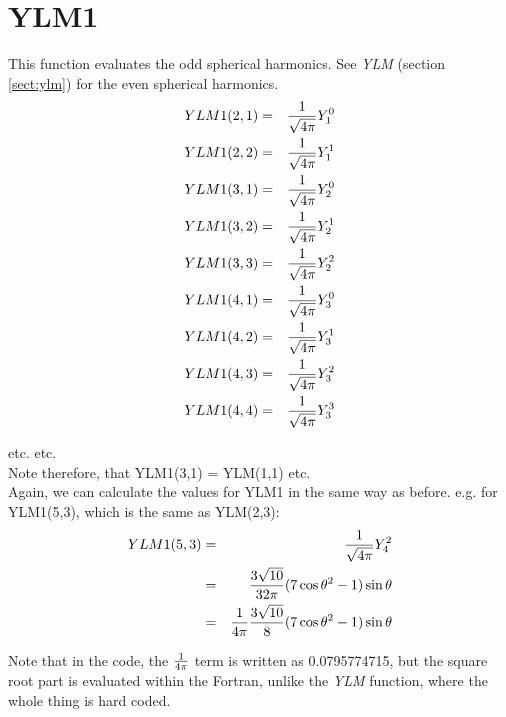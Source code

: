 \section{YLM1}
\label{sect:ylm1}

\noindent This function evaluates the odd spherical harmonics. See {\em
YLM} (section \ref{sect:ylm}) for the even spherical harmonics.\\

\begin{eqnarray}
YLM1(2,1)&=&{1 \over \sqrt{4 \pi}} Y_1^0\nonumber\\
YLM1(2,2)&=&{1 \over \sqrt{4 \pi}} Y_1^1\nonumber\\
YLM1(3,1)&=&{1 \over \sqrt{4 \pi}} Y_2^0\nonumber\\
YLM1(3,2)&=&{1 \over \sqrt{4 \pi}} Y_2^1\nonumber\\
YLM1(3,3)&=&{1 \over \sqrt{4 \pi}} Y_2^2\nonumber\\
YLM1(4,1)&=&{1 \over \sqrt{4 \pi}} Y_3^0\nonumber\\
YLM1(4,2)&=&{1 \over \sqrt{4 \pi}} Y_3^1\nonumber\\
YLM1(4,3)&=&{1 \over \sqrt{4 \pi}} Y_3^2\nonumber\\
YLM1(4,4)&=&{1 \over \sqrt{4 \pi}} Y_3^3\nonumber\\
\end{eqnarray}

etc. etc.\\

Note therefore, that YLM1(3,1) = YLM(1,1) etc.\\

Again, we can calculate the values for YLM1 in the same way as before. e.g.
for YLM1(5,3), which is the same as YLM(2,3):\\

\begin{eqnarray}
YLM1(5,3)&=&{1 \over \sqrt{4 \pi}} Y_4^2\nonumber\\
         &=&{3 \sqrt{10} \over 32 \pi} (7 \cos\theta^2 - 1) \sin\theta\nonumber\\
         &=&{1 \over 4 \pi} {3 \sqrt{10} \over 8} (7 \cos\theta^2 - 1)
	 \sin\theta\nonumber\\
\end{eqnarray}

Note that in the code, the ${1 \over 4 \pi}$ term is written as
0.0795774715, but the square root part is evaluated within the Fortran,
unlike the {\em YLM} function, where the whole thing is hard coded.\\

